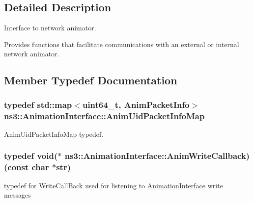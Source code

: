\subsection{Detailed Description}
Interface to network animator. 

Provides functions that facilitate communications with an external or internal network animator. 

\subsection{Member Typedef Documentation}
\subsubsection[{\texorpdfstring{Anim\+Uid\+Packet\+Info\+Map}{AnimUidPacketInfoMap}}]{\setlength{\rightskip}{0pt plus 5cm}typedef std\+::map$<$uint64\+\_\+t, {\bf Anim\+Packet\+Info}$>$ {\bf ns3\+::\+Animation\+Interface\+::\+Anim\+Uid\+Packet\+Info\+Map}\hspace{0.3cm}{\ttfamily [private]}}\hypertarget{classns3_1_1AnimationInterface_afea577896009c4134df836bc20f1eabe}{}\label{classns3_1_1AnimationInterface_afea577896009c4134df836bc20f1eabe}


Anim\+Uid\+Packet\+Info\+Map typedef. 

\subsubsection[{\texorpdfstring{Anim\+Write\+Callback}{AnimWriteCallback}}]{\setlength{\rightskip}{0pt plus 5cm}typedef void($\ast$ ns3\+::\+Animation\+Interface\+::\+Anim\+Write\+Callback) (const char $\ast$str)}\hypertarget{classns3_1_1AnimationInterface_a91003c61e43e2d6cb6192a55d3d69796}{}\label{classns3_1_1AnimationInterface_a91003c61e43e2d6cb6192a55d3d69796}


typedef for Write\+Call\+Back used for listening to \hyperlink{classns3_1_1AnimationInterface}{Animation\+Interface} write messages 

